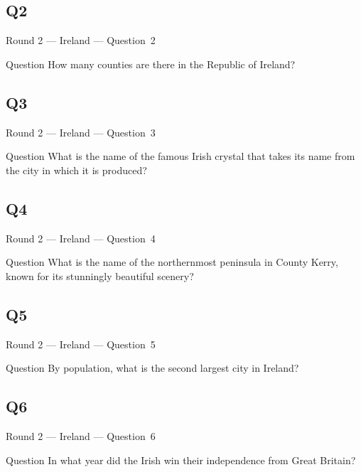 \documentclass[11pt]{beamer}
\begin{document}
\subsection*{Q2}
\begin{frame}[t]{Round 2 --- Ireland --- \mbox{Question 2}}
\vspace{-0.5em}
\begin{block}{Question}
How many counties are there in the Republic of Ireland?
\end{block}
\end{frame}
\subsection*{Q3}
\begin{frame}[t]{Round 2 --- Ireland --- \mbox{Question 3}}
\vspace{-0.5em}
\begin{block}{Question}
What is the name of the famous Irish crystal that takes its name from the city in which it is produced?
\end{block}
\end{frame}
\subsection*{Q4}
\begin{frame}[t]{Round 2 --- Ireland --- \mbox{Question 4}}
\vspace{-0.5em}
\begin{block}{Question}
What is the name of the northernmost peninsula in County Kerry, known for its stunningly beautiful scenery?
\end{block}
\end{frame}
\subsection*{Q5}
\begin{frame}[t]{Round 2 --- Ireland --- \mbox{Question 5}}
\vspace{-0.5em}
\begin{block}{Question}
By population, what is the second largest city in Ireland?
\end{block}
\end{frame}
\subsection*{Q6}
\begin{frame}[t]{Round 2 --- Ireland --- \mbox{Question 6}}
\vspace{-0.5em}
\begin{block}{Question}
In what year did the Irish win their independence from Great Britain?
\end{block}
\end{frame}
\end{document}
